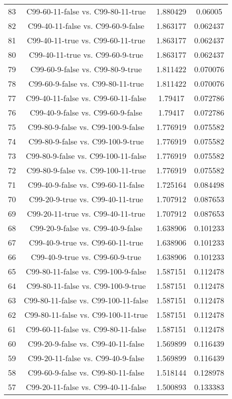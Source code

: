 \documentclass[a4paper,10pt]{article}
\begin{document}
\begin{landscape}
\begin{table}[!htp]
\begin{tabular}{cccc}
83&C99-60-11-false vs. C99-80-11-true&1.880429&0.06005\\
82&C99-40-11-false vs. C99-60-9-false&1.863177&0.062437\\
81&C99-40-11-true vs. C99-60-11-true&1.863177&0.062437\\
80&C99-40-11-true vs. C99-60-9-true&1.863177&0.062437\\
79&C99-60-9-false vs. C99-80-9-true&1.811422&0.070076\\
78&C99-60-9-false vs. C99-80-11-true&1.811422&0.070076\\
77&C99-40-11-false vs. C99-60-11-false&1.79417&0.072786\\
76&C99-40-9-false vs. C99-60-9-false&1.79417&0.072786\\
75&C99-80-9-false vs. C99-100-9-false&1.776919&0.075582\\
74&C99-80-9-false vs. C99-100-9-true&1.776919&0.075582\\
73&C99-80-9-false vs. C99-100-11-false&1.776919&0.075582\\
72&C99-80-9-false vs. C99-100-11-true&1.776919&0.075582\\
71&C99-40-9-false vs. C99-60-11-false&1.725164&0.084498\\
70&C99-20-9-true vs. C99-40-11-true&1.707912&0.087653\\
69&C99-20-11-true vs. C99-40-11-true&1.707912&0.087653\\
68&C99-20-9-false vs. C99-40-9-false&1.638906&0.101233\\
67&C99-40-9-true vs. C99-60-11-true&1.638906&0.101233\\
66&C99-40-9-true vs. C99-60-9-true&1.638906&0.101233\\
65&C99-80-11-false vs. C99-100-9-false&1.587151&0.112478\\
64&C99-80-11-false vs. C99-100-9-true&1.587151&0.112478\\
63&C99-80-11-false vs. C99-100-11-false&1.587151&0.112478\\
62&C99-80-11-false vs. C99-100-11-true&1.587151&0.112478\\
61&C99-60-11-false vs. C99-80-11-false&1.587151&0.112478\\
60&C99-20-9-false vs. C99-40-11-false&1.569899&0.116439\\
59&C99-20-11-false vs. C99-40-9-false&1.569899&0.116439\\
58&C99-60-9-false vs. C99-80-11-false&1.518144&0.128978\\
57&C99-20-11-false vs. C99-40-11-false&1.500893&0.133383\\

\end{tabular}
\end{table}
\end{landscape}
\end{document}
